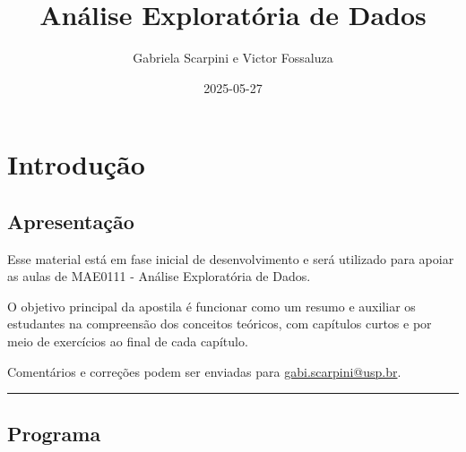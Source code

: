 \documentclass[
]{book}
\title{Análise Exploratória de Dados}
\author{Gabriela Scarpini e Victor Fossaluza}
\date{2025-05-27}
\begin{document}
\maketitle

{
\setcounter{tocdepth}{1}
\tableofcontents
}
\chapter{Introdução}\label{intro}

\section{Apresentação}\label{apresentauxe7uxe3o}

Esse material está em fase inicial de desenvolvimento e será utilizado para apoiar as aulas de MAE0111 - Análise Exploratória de Dados.

O objetivo principal da apostila é funcionar como um resumo e auxiliar os estudantes na compreensão dos conceitos teóricos, com capítulos curtos e por meio de exercícios ao final de cada capítulo.

Comentários e correções podem ser enviadas para \url{gabi.scarpini@usp.br}.

\begin{center}\rule{0.5\linewidth}{0.5pt}\end{center}

\section{Programa}\label{programa}
\end{document}
